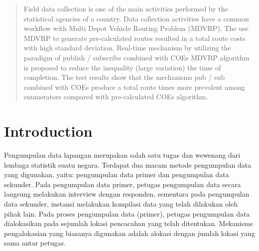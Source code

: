 \documentclass[conference]{IEEEtran}
\begin{document}




\maketitle

\begin{abstract}
Field data collection is one of the main activities performed by the statistical agencies of a country. Data collection activities have a common workflow with Multi Depot Vehicle Routing Problem (MDVRP). The use MDVRP to generate pre-calculated routes resulted in a total route costs with high standard deviation. Real-time mechanism by utilizing the paradigm of publish / subscribe combined with COEs MDVRP algorithm is proposed to reduce the inequality (large variation) the time of completion. The test results show that the mechanisms pub / sub combined with COEs produce a total route times more prevalent among enumerators compared with pre-calculated COEs algorithm.
\end{abstract}





%
\IEEEpeerreviewmaketitle




\section{Introduction}
\label{sec:introduction}
Pengumpulan data lapangan merupakan salah satu tugas dan wewenang dari lembaga statistik suatu negara. Terdapat dua macam metode pengumpulan data yang digunakan, yaitu: pengumpulan data primer dan pengumpulan data sekunder. Pada pengumpulan data primer, petugas pengumpulan data secara langsung melakukan interview dengan responden, sementara pada pengumpulan data sekunder, instansi melakukan kompilasi data yang telah dilakukan oleh pihak lain. Pada proses pengumpulan data (primer), petugas pengumpulan data dialokasikan pada sejumlah lokasi pencacahan yang telah ditentukan. Mekanisme pengalokasian yang biasanya digunakan adalah alokasi dengan jumlah lokasi yang sama antar petugas.
\end{document}
